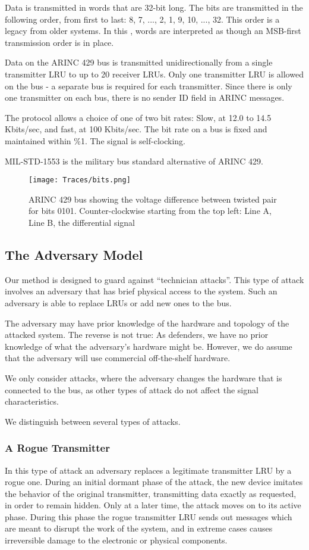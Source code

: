 \documentclass[compsoc,conference,a4paper,10pt,times]{IEEEtran}
\newcommand{\sublevel}[1]{\subsection{#1}}
\newcommand{\subsublevel}[1]{\subsubsection{#1}}
\newcommand{\sublevel}[1]{\section{#1}}
\newcommand{\subsublevel}[1]{\subsection{#1}}
\begin{document}
  Data is transmitted in words that are 32-bit long. The bits are transmitted in the following order, from first to last: 8, 7, ..., 2, 1, 9, 10, ..., 32. This order is a legacy from older systems. In this \iftoggle{paper} {paper} {work}, words are interpreted as though an MSB-first transmission order is in place.
  
  Data on the ARINC 429 bus is transmitted unidirectionally from a single transmitter LRU to up to 20 receiver LRUs. Only one transmitter LRU is allowed on the bus - a separate bus is required for each transmitter. Since there is only one transmitter on each bus, there is no sender ID field in ARINC messages.
   
  The protocol allows a choice of one of two bit rates: Slow, at 12.0 to 14.5 Kbits/sec, and fast, at 100 Kbits/sec. The bit rate on a bus is fixed and maintained within \%1. The signal is self-clocking.
  
  MIL-STD-1553 \cite{united1986milstd1553} is the military bus standard alternative of ARINC 429.
  
  \begin{figure}[t]
    \centering
    \texttt{[image: Traces/bits.png]}
    \caption{ARINC 429 bus showing the voltage difference between twisted pair for bits 0101. Counter-clockwise starting from the top left: Line A, Line B, the differential signal}
    \label{fig:word_example}
  \end{figure}
  
\sublevel{The Adversary Model}
  Our method is designed to guard against ``technician attacks''. This type of attack involves an adversary that has brief physical access to the system. Such an adversary is able to replace LRUs or add new ones to the bus.
  
  The adversary may have prior knowledge of the hardware and topology of the attacked system. The reverse is not true: As defenders, we have no prior knowledge of what the adversary's hardware might be. However, we do assume that the adversary will use commercial off-the-shelf hardware.
  
  We only consider attacks, where the adversary changes the hardware that is connected to the bus, as other types of attack do not affect the signal characteristics.
  
  We distinguish between several types of attacks.

\subsublevel{A Rogue Transmitter}
  In this type of attack an adversary replaces a legitimate transmitter LRU by a rogue one. During an initial dormant phase of the attack, the new device imitates the behavior of the original transmitter, transmitting data exactly as requested, in order to remain hidden. Only at a later time, the attack moves on to its active phase. During this phase the rogue transmitter LRU sends out messages which are meant to disrupt the work of the system, and in extreme cases causes irreversible damage to the electronic or physical components.
  
\end{document}
